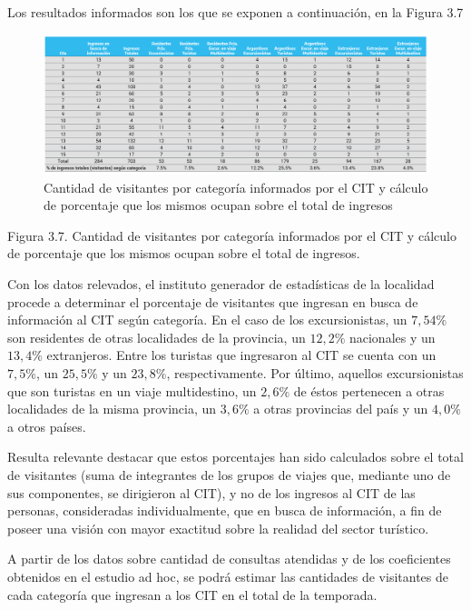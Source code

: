 \documentclass[
]{book}
\begin{document}
Los resultados informados son los que se exponen a continuación, en la Figura 3.7

\begin{figure}

{\centering \includegraphics[width=1\linewidth]{imagenes/figura09} 

}

\caption{Cantidad de visitantes por categoría informados por el CIT y cálculo de porcentaje que los mismos ocupan sobre el total de ingresos}\label{fig:cantidaddevisitantes}
\end{figure}

Figura 3.7. Cantidad de visitantes por categoría informados por el CIT y cálculo de porcentaje que los mismos ocupan sobre el total de ingresos.

Con los datos relevados, el instituto generador de estadísticas de la localidad procede a determinar el porcentaje de visitantes que ingresan en busca de información al CIT según categoría. En el caso de los excursionistas, un \(7,54\%\) son residentes de otras localidades de la provincia, un \(12,2\%\) nacionales y un \(13,4\%\) extranjeros. Entre los turistas que ingresaron al CIT se cuenta con un \(7,5\%\), un \(25,5\%\) y un \(23,8\%\), respectivamente. Por último, aquellos excursionistas que son turistas en un viaje multidestino, un \(2,6\%\) de éstos pertenecen a otras localidades de la misma provincia, un \(3,6\%\) a otras provincias del país y un \(4,0\%\) a otros países.

Resulta relevante destacar que estos porcentajes han sido calculados sobre el total de visitantes (suma de integrantes de los grupos de viajes que, mediante uno de sus componentes, se dirigieron al CIT), y no de los ingresos al CIT de las personas, consideradas individualmente, que en busca de información, a fin de poseer una visión con mayor exactitud sobre la realidad del sector turístico.

A partir de los datos sobre cantidad de consultas atendidas y de los coeficientes obtenidos en el estudio ad hoc, se podrá estimar las cantidades de visitantes de cada categoría que ingresan a los CIT en el total de la temporada.
\end{document}
